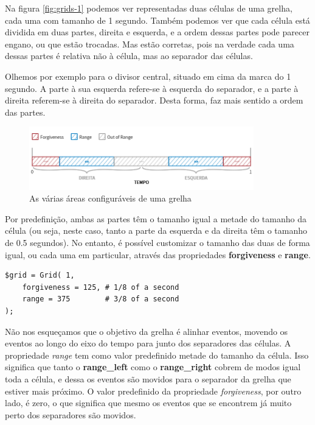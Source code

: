 Na figura \ref{fig:grids-1} podemos ver representadas duas células de uma grelha, cada uma com tamanho de 1 segundo. Também podemos ver que cada célula está dividida em duas partes, direita e esquerda, e a ordem dessas partes pode parecer engano, ou que estão trocadas. Mas estão corretas, pois na verdade cada uma dessas partes é relativa não à célula, mas ao separador das células.

Olhemos por exemplo para o divisor central, situado em cima da marca do 1 segundo. A parte à sua esquerda refere-se à esquerda do separador, e a parte à direita referem-se à direita do separador. Desta forma, faz mais sentido a ordem das partes.

\begin{figure}[h]
\begin{center}
    \includegraphics[width=0.87\textwidth]{img/grids_2.png}
\end{center}
\caption{As várias áreas configuráveis de uma grelha}
\label{fig:grids-2}
\end{figure}

Por predefinição, ambas as partes têm o tamanho igual a metade do tamanho da célula (ou seja, neste caso, tanto a parte da esquerda e da direita têm o tamanho de 0.5 segundos). No entanto, é possível customizar o tamanho das duas de forma igual, ou cada uma em particular, através das propriedades \textbf{forgiveness} e \textbf{range}.

\begin{lstlisting}[caption={Código de definição da grelha representada na figura \ref{fig:grids-2}},label={lst:grids-2}]
$grid = Grid( 1,
    forgiveness = 125, # 1/8 of a second
    range = 375        # 3/8 of a second
);
\end{lstlisting}

Não nos esqueçamos que o objetivo da grelha é alinhar eventos, movendo os eventos ao longo do eixo do tempo para junto dos separadores das células. A propriedade \textit{range} tem como valor predefinido metade do tamanho da célula. Isso significa que tanto o \textbf{range\_left} como o \textbf{range\_right} cobrem de modos igual toda a célula, e dessa os eventos são movidos para o separador da grelha que estiver mais próximo. O valor predefinido da propriedade \textit{forgiveness}, por outro lado, é zero, o que significa que mesmo os eventos que se encontrem já muito perto dos separadores são movidos.

